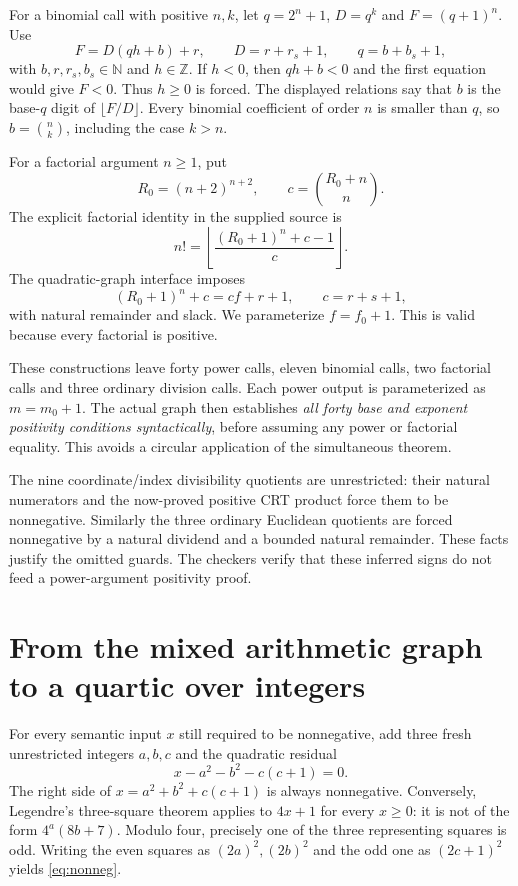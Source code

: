 \documentclass[11pt]{article}
\theoremstyle{definition}
\theoremstyle{remark}
\newcommand{\NN}{\mathbb N}
\newcommand{\ZZ}{\mathbb Z}
\begin{document}
For a binomial call with positive $n,k$, let $q=2^n+1$,
$D=q^k$ and $F=(q+1)^n$. Use
\[
 F=D(qh+b)+r,\qquad D=r+r_s+1,\qquad q=b+b_s+1,
\]
with $b,r,r_s,b_s\in\NN$ and $h\in\ZZ$.
If $h<0$, then $qh+b<0$ and the first equation would give $F<0$.
Thus $h\ge0$ is forced. The displayed relations say that $b$ is the
base-$q$ digit of $\lfloor F/D\rfloor$.
Every binomial coefficient of order $n$ is smaller than $q$, so
$b=\binom nk$, including the case $k>n$.

For a factorial argument $n\ge1$, put
\[
 R_0=(n+2)^{n+2},\qquad c=\binom{R_0+n}{n}.
\]
The explicit factorial identity in the supplied source is
\[
 n!=\left\lfloor\frac{(R_0+1)^n+c-1}{c}\right\rfloor.
\]
The quadratic-graph interface imposes
\[
 (R_0+1)^n+c=cf+r+1,\qquad c=r+s+1,
\]
with natural remainder and slack. We parameterize $f=f_0+1$.
This is valid because every factorial is positive.

These constructions leave forty power calls, eleven binomial calls,
two factorial calls and three ordinary division calls. Each power
output is parameterized as $m=m_0+1$. The actual graph then establishes
\emph{all forty base and exponent positivity conditions syntactically},
before assuming any power or factorial equality. This avoids a circular
application of the simultaneous theorem.

The nine coordinate/index divisibility quotients are unrestricted:
their natural numerators and the now-proved positive CRT product force
them to be nonnegative. Similarly the three ordinary Euclidean quotients
are forced nonnegative by a natural dividend and a bounded natural
remainder. These facts justify the omitted guards. The checkers verify
that these inferred signs do not feed a power-argument positivity proof.

\section{From the mixed arithmetic graph to a quartic over integers}

For every semantic input $x$ still required to be nonnegative, add three
fresh unrestricted integers $a,b,c$ and the quadratic residual
\begin{equation}\label{eq:nonneg}
 x-a^2-b^2-c(c+1)=0.
\end{equation}
The right side of $x=a^2+b^2+c(c+1)$ is always nonnegative.
Conversely, Legendre's three-square theorem applies to $4x+1$ for every
$x\ge0$: it is not of the form $4^a(8b+7)$.
Modulo four, precisely one of the three representing squares is odd.
Writing the even squares as $(2a)^2,(2b)^2$ and the odd one as
$(2c+1)^2$ yields \eqref{eq:nonneg}.
\end{document}

